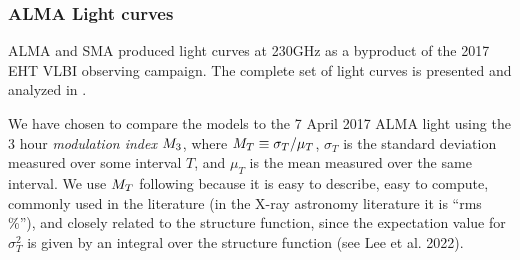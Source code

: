 
\subsubsection{ALMA Light curves}


ALMA and SMA produced \sgra light curves at 230GHz as a byproduct of the 2017 EHT VLBI observing campaign. The complete set of light curves is presented and analyzed in \cite{Wielgus2022}.

We have chosen to compare the models to the 7 April 2017 ALMA light using the 3 hour {\em modulation index} $M_{3}$, where $M_{T} \equiv \sigma_T/\mu_T$, $\sigma_T$ is the standard deviation measured over some interval $T$, and $\mu_T$ is the mean measured over the same interval.  We use $M_{T}$ following \citet{2015ApJ...812..103C} because it is easy to describe, easy to compute, commonly used in the literature (in the X-ray astronomy literature it is ``rms \%''), and closely related to the structure function, since the expectation value for $\sigma_T^2$ is given by an integral over the structure function (see Lee et al. 2022).

